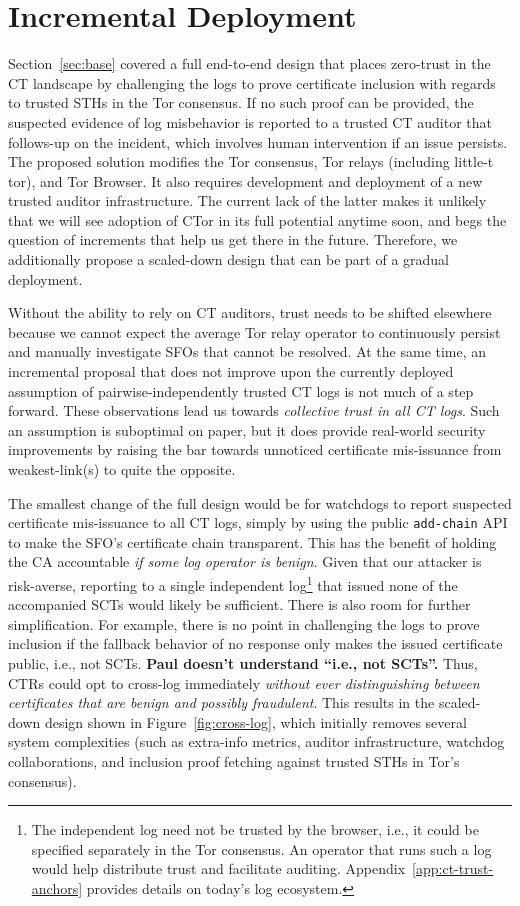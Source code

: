 \section{Incremental Deployment} \label{sec:incremental} Section~\ref{sec:base}
covered a full end-to-end design that places zero-trust in the CT landscape by
challenging the logs to prove certificate inclusion with regards to trusted STHs
in the Tor consensus.  If no such proof can be provided, the suspected evidence
of log misbehavior is reported to a trusted CT auditor that follows-up on the
incident, which involves human intervention if an issue persists.  The proposed
solution modifies the Tor consensus, Tor relays (including little-t tor), and
Tor Browser.  It also requires development and deployment of a new trusted
auditor infrastructure.  The current lack of the latter makes it unlikely that
we will see adoption of CTor in its full potential anytime soon, and begs the
question of increments that help us get there in the future.  Therefore, we
additionally propose a scaled-down design that can be part of a gradual
deployment.

Without the ability to rely on CT auditors, trust needs to be shifted elsewhere
because we cannot expect the average Tor relay operator to continuously persist
and manually investigate SFOs that cannot be resolved.  At the same time, an
incremental proposal that does not improve upon the currently deployed
assumption of pairwise-independently trusted CT logs is not much of a
step forward.
These observations lead us towards
	\emph{collective trust in all CT logs}.
Such an assumption is suboptimal on paper, but it does provide real-world
security improvements by raising the bar towards unnoticed certificate
mis-issuance from weakest-link(s) to quite the opposite.

The smallest change of the full design would be for watchdogs to report
suspected certificate mis-issuance to all CT logs, simply by using the public
\texttt{add-chain} API to make the SFO's certificate chain transparent.  This
has the benefit of holding the CA accountable \emph{if some log operator is
benign}.  Given that our attacker is risk-averse, reporting to a single
independent log\footnote{%
	The independent log need not be trusted by the browser, i.e., it could be
	specified separately in the Tor consensus.  An operator that runs such a
	log would help distribute trust and facilitate auditing.
	Appendix~\ref{app:ct-trust-anchors} provides details on today's log
	ecosystem.
} that issued none of the accompanied SCTs would likely be sufficient.  There is
also room for further simplification.  For example, there is no point in
challenging the logs to prove inclusion if the fallback behavior of no response
only makes the issued certificate public, i.e., not SCTs.
{\bf \color{red} Paul doesn't understand ``i.e., not SCTs''.}
  Thus, CTRs could opt
to cross-log immediately \emph{without ever distinguishing between certificates
that are benign and possibly fraudulent}.  This results in the scaled-down
design shown in Figure~\ref{fig:cross-log}, which initially removes several
system complexities (such as extra-info metrics, auditor infrastructure,
watchdog collaborations, and inclusion proof fetching against trusted STHs in
Tor's consensus).


